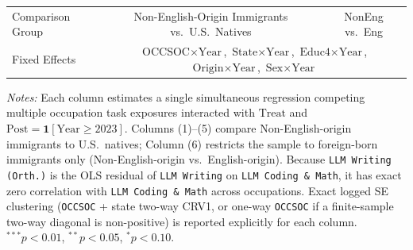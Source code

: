 \begin{table}[htbp]
{\begin{tabular}{lcccccc}
Comparison Group & \multicolumn{5}{c}{Non-English-Origin Immigrants vs.\ U.S.\ Natives} & NonEng vs.\ Eng \\
Fixed Effects & \multicolumn{6}{c}{$\text{OCCSOC}\times\text{Year}$, $\text{State}\times\text{Year}$, $\text{Educ4}\times\text{Year}$, $\text{Origin}\times\text{Year}$, $\text{Sex}\times\text{Year}$} \\
\bottomrule
\end{tabular}%
}
\vspace{4pt}
\begin{minipage}{\textwidth}\scriptsize
\textit{Notes:} Each column estimates a single simultaneous regression competing multiple occupation task exposures interacted with $\text{Treat}$ and $\text{Post} = \mathbf{1}[\text{Year}\ge 2023]$. Columns (1)--(5) compare Non-English-origin immigrants to U.S.\ natives; Column (6) restricts the sample to foreign-born immigrants only (Non-English-origin vs.\ English-origin). Because \texttt{LLM Writing (Orth.)} is the OLS residual of \texttt{LLM Writing} on \texttt{LLM Coding \& Math}, it has exact zero correlation with \texttt{LLM Coding \& Math} across occupations. Exact logged SE clustering (\texttt{OCCSOC} + state two-way CRV1, or one-way \texttt{OCCSOC} if a finite-sample two-way diagonal is non-positive) is reported explicitly for each column. $^{***}p<0.01$, $^{**}p<0.05$, $^{*}p<0.10$.
\end{minipage}
\end{table}
